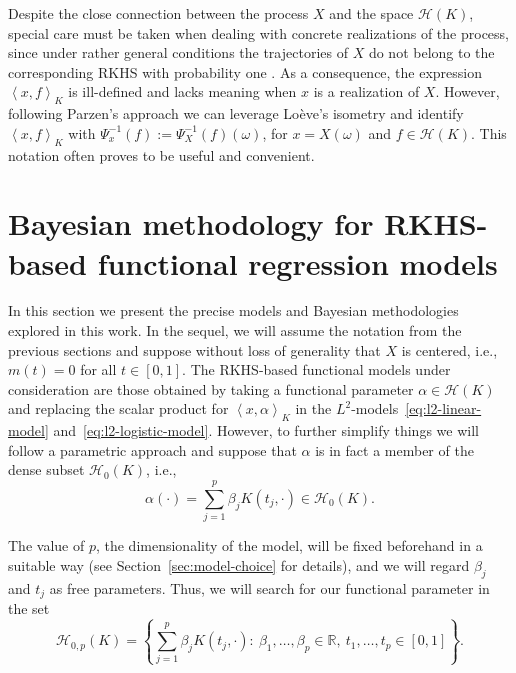 \documentclass[ba]{imsart}
\numberwithin{equation}{section}
\theoremstyle{plain}
\newcommand{\R}{\mathbb{R}}
\newcommand\dotprod[2]{\left\langle #1, #2 \right\rangle}
\begin{document}
Despite the close connection between the process \(X\) and the space \(\mathcal H(K)\), special care must be taken when dealing with concrete realizations of the process, since under rather general conditions the trajectories of \(X\) do not belong to the corresponding RKHS with probability one \citep[see for example][Cor.~7.1]{lukic2001stochastic}. As a consequence, the expression \(\dotprod{x}{f}_K\) is ill-defined and lacks meaning when \(x\) is a realization of \(X\). However, following Parzen's approach \citep[Th.~4E]{parzen1961approach} we can leverage Loève's isometry and identify \(\dotprod{x}{f}_K \) with \( \Psi_x^{-1}(f) := \Psi_X^{-1}(f)(\omega)\), for \(x=X(\omega)\) and \(f\in \mathcal H(K)\). This notation often proves to be useful and convenient.

\section{Bayesian methodology for RKHS-based functional regression models}\label{sec:methodology}

In this section we present the precise models and Bayesian methodologies explored in this work. In the sequel, we will assume the notation from the previous sections and suppose without loss of generality that \(X\) is centered, i.e., \(m(t)=0\) for all \(t\in[0, 1]\). The RKHS-based functional models under consideration are those obtained by taking a functional parameter \(\alpha \in \mathcal H(K)\) and replacing the scalar product for \(\dotprod{x}{\alpha}_K\) in the \(L^2\)-models~\eqref{eq:l2-linear-model} and~\eqref{eq:l2-logistic-model}. However, to further simplify things we will follow a parametric approach and suppose that \(\alpha\) is in fact a member of the dense subset \(\mathcal H_0(K)\), i.e.,
\begin{equation}\label{eq:alpha-parameter-rkhs}
  \alpha(\cdot) = \sum_{j=1}^p \beta_j K(t_j, \cdot) \in \mathcal H_0(K).
\end{equation}

The value of \(p\), the dimensionality of the model, will be fixed beforehand in a suitable way (see Section~\ref{sec:model-choice} for details), and we will regard \(\beta_j\) and \(t_j\) as free parameters. Thus, we will search for our functional parameter in the set
\[
\mathcal H_{0,p}(K)=\left\{ \sum_{j=1}^p \beta_j K(t_j, \cdot): \ \beta_1,\dots,\beta_p \in \R, \ t_1,\dots,t_p \in [0, 1]\right\}.
\]
\end{document}
